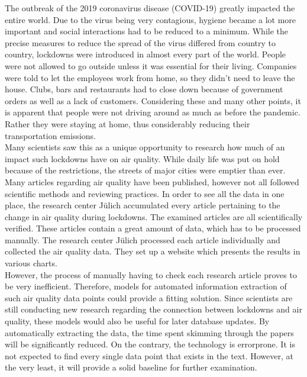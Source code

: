 The outbreak of the 2019 coronavirus disease (COVID-19) greatly impacted the entire world. Due to the virus being very contagious, hygiene became a lot more important and social interactions had to be reduced to a minimum. While the precise measures to reduce the spread of the virus differed from country to country, lockdowns were introduced in almost every part of the world. People were not allowed to go outside unless it was essential for their living. Companies were told to let the employees work from home, so they didn't need to leave the house. Clubs, bars and restaurants had to close down because of government orders as well as a lack of customers. Considering these and many other points, it is apparent that people were not driving around as much as before the pandemic. Rather they were staying at home, thus considerably reducing their transportation emissions. \\
Many scientists saw this as a unique opportunity to research how much of an impact such lockdowns have on air quality. While daily life was put on hold because of the restrictions, the streets of major cities were emptier than ever. Many articles regarding air quality have been published, however not all followed scientific methods and reviewing practices. In order to see all the data in one place, the research center Jülich accumulated every article pertaining to the change in air quality during lockdowns. The examined articles are all scientifically verified\cite{base}. These articles contain a great amount of data, which has to be processed manually. The research center Jülich processed each article individually and collected the air quality data. They set up a website which presents the results in various charts. \\
However, the process of manually having to check each research article proves to be very inefficient. Therefore, models for automated information extraction of such air quality data points could provide a fitting solution. Since scientists are still conducting new research regarding the connection between lockdowns and air quality, these models would also be useful for later database updates. By automatically extracting the data, the time spent skimming through the papers will be significantly reduced. On the contrary, the technology is errorprone. It is not expected to find every single data point that exists in the text. However, at the very least, it will provide a solid baseline for further examination. 

